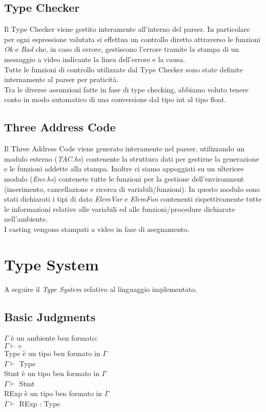 \documentclass[12pt]{article}
\begin{document}
\subsection{Type Checker}
Il Type Checker viene gestito interamente all'interno del parser. In particolare per ogni espressione valutata si effettua un controllo diretto attraverso le funzioni \textit{Ok} e \textit{Bad} che, in caso di errore, gestiscono l'errore tramite la stampa di un messaggio a video indicante la linea dell'errore e la causa.\\
Tutte le funzioni di controllo utilizzate dal Type Checker sono state definite internamente al parser per praticità.\\
Tra le diverse assunzioni fatte in fase di type checking, abbiamo voluto tenere conto in modo automatico di una conversione dal tipo int al tipo float.

\subsection{Three Address Code}
Il Three Address Code viene generato interamente nel parser, utilizzando un modulo esterno (\textit{TAC.hs}) contenente la struttura dati per gestirne la generazione e le funzioni addette alla stampa. Inoltre ci siamo appoggiati su un ulteriore modulo (\textit{Env.hs}) contenete tutte le funzioni per la gestione dell'environment (inserimento, cancellazione e ricerca di variabili/funzioni).
In questo modulo sono stati dichiarati i tipi di dato \textit{ElemVar} e \textit{ElemFun} contenenti rispettivamente tutte le informazioni relative alle variabili ed alle funzioni/procedure dichiarate nell'ambiente.\\
I casting vengono stampati a video in fase di asegnamento.

\section{Type System}
A seguire il \textit{Type System} relativo al linguaggio implementato.
\subsection*{Basic Judgments}
\begin{center}
$\Gamma$ è un ambiente ben formato:\\
$\Gamma \vdash \diamond$\\[0.1in]
Type è un tipo ben formato in $\Gamma$\\
$\Gamma \vdash $ Type\\[0.1in]
Stmt è un tipo ben formato in $\Gamma$\\
$\Gamma \vdash $ Stmt\\[0.1in]
RExp è un tipo ben formato in $\Gamma$\\
$\Gamma \vdash $ RExp : Type\\[0.1in]
\end{center}
\end{document}
